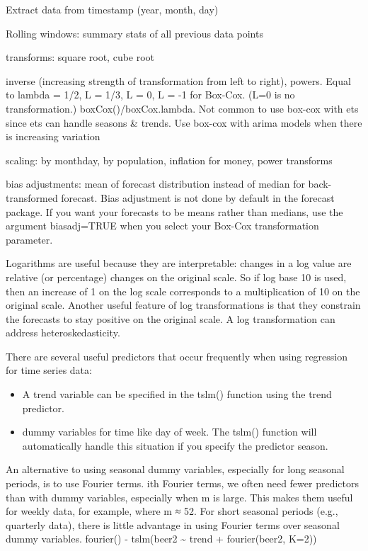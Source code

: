 \documentclass[]{book}
\begin{document}
Extract data from timestamp (year, month, day)

Rolling windows: summary stats of all previous data points

transforms: square root, cube root

inverse (increasing strength of transformation from left to right), powers. Equal to lambda = 1/2, L = 1/3, L = 0, L = -1 for Box-Cox. (L=0 is no transformation.) boxCox()/boxCox.lambda. Not common to use box-cox with ets since ets can handle seasons \& trends. Use box-cox with arima models when there is increasing variation

scaling: by monthday, by population, inflation for money, power transforms

bias adjustments: mean of forecast distribution instead of median for back-transformed forecast. Bias adjustment is not done by default in the forecast package. If you want your forecasts to be means rather than medians, use the argument biasadj=TRUE when you select your Box-Cox transformation parameter.

Logarithms are useful because they are interpretable: changes in a log value are relative (or percentage) changes on the original scale. So if log base 10 is used, then an increase of 1 on the log scale corresponds to a multiplication of 10 on the original scale. Another useful feature of log transformations is that they constrain the forecasts to stay positive on the original scale. A log transformation can address heteroskedasticity.

There are several useful predictors that occur frequently when using regression for time series data:

\begin{itemize}
\item
  A trend variable can be specified in the tslm() function using the trend predictor.
\item
  dummy variables for time like day of week. The tslm() function will automatically handle this situation if you specify the predictor season.
\end{itemize}

An alternative to using seasonal dummy variables, especially for long seasonal periods, is to use Fourier terms. ith Fourier terms, we often need fewer predictors than with dummy variables, especially when m is large. This makes them useful for weekly data, for example, where m ≈ 52. For short seasonal periods (e.g., quarterly data), there is little advantage in using Fourier terms over seasonal dummy variables. fourier() - tslm(beer2 \textasciitilde{} trend + fourier(beer2, K=2))
\end{document}
